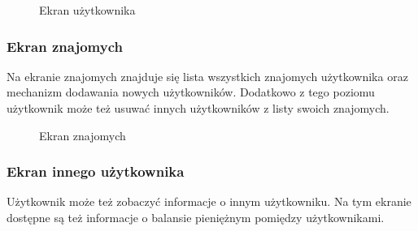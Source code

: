 \begin{figure}[h!]%
    \centering
    \qquad
    \caption{Ekran użytkownika}%
    \label{fig:example}%
\end{figure}

\newpage
\subsubsection{Ekran znajomych}
Na ekranie znajomych znajduje się lista wszystkich znajomych użytkownika oraz mechanizm dodawania nowych użytkowników. Dodatkowo z tego poziomu użytkownik może też usuwać innych użytkowników z listy swoich znajomych.

\begin{figure}[h!]%
    \centering
    \qquad
    \caption{Ekran znajomych}%
    \label{fig:example}%
\end{figure}

\newpage
\subsubsection{Ekran innego użytkownika}
Użytkownik może też zobaczyć informacje o innym użytkowniku. Na tym ekranie dostępne są też informacje o balansie pieniężnym pomiędzy użytkownikami.

\begin{figure}[h!]%
    \centering
    \label{fig:example}%
\end{figure}
